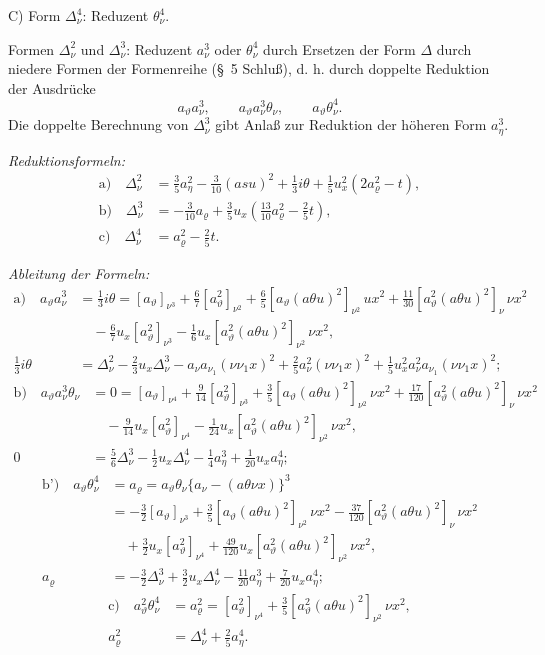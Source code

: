 \documentclass[11pt]{article}
\newcommand{\A}{\Delta}
\newcommand{\R}{\varrho}
\begin{document}
\noindent C) Form $\A_\nu^4$: Reduzent $\theta_\nu^4$.

Formen $\A_\nu^2$ und $\A_\nu^3$: Reduzent $a_\nu^3$ oder $\theta_\nu^4$ durch Ersetzen der Form $\A$ durch niedere Formen der Formenreihe (\S\ 5 Schluß), d. h. durch doppelte Reduktion der Ausdrücke
\[
a_\vartheta a_\nu^3,
\qquad a_\vartheta a_\nu^3\theta_\nu,
\qquad a_\vartheta\theta_\nu^4.
\]
Die doppelte Berechnung von $\A_\nu^3$ gibt Anlaß zur Reduktion der höheren Form $a_\eta^3$.

\noindent\emph{Reduktionsformeln:}
\[
\tag{10}
\begin{aligned}
\text{a)}\quad \A_\nu^2
&=\frac35a_\eta^2-\frac3{10}(asu)^2+\frac13 i\theta
+\frac15u_x^2(2a_\R^2-t),\\
\text{b)}\quad \A_\nu^3
&=-\frac3{10}a_\R+\frac35u_x\left(\frac{13}{10}a_\R^2-\frac25t\right),\\
\text{c)}\quad \A_\nu^4&=a_\R^2-\frac25t.
\end{aligned}
\]

\noindent\emph{Ableitung der Formeln:}
\[
\begin{aligned}
\text{a)}\quad
 a_\vartheta a_\nu^3
&=\frac13 i\theta
=[a_\vartheta]_{\nu^3}+\frac67[a_\vartheta^2]_{\nu^2}
+\frac65[a_\vartheta(a\theta u)^2]_{\nu^2}\,
u x^2
+\frac{11}{30}[a_\vartheta^2(a\theta u)^2]_\nu\,\nu x^2\\
&\quad-\frac67u_x[a_\vartheta^2]_{\nu^3}
-\frac16u_x[a_\vartheta^2(a\theta u)^2]_{\nu^2}\,\nu x^2,\\
\frac13 i\theta
&=\A_\nu^2-\frac23u_x\A_\nu^3-a_\nu a_{\nu_1}(\nu\nu_1x)^2
+\frac25a_\nu^2(\nu\nu_1x)^2
+\frac15u_x^2a_\nu^2a_{\nu_1}(\nu\nu_1x)^2;
\end{aligned}
\]
\[
\begin{aligned}
\text{b)}\quad
 a_\vartheta a_\nu^3\theta_\nu
&=0=[a_\vartheta]_{\nu^4}+\frac9{14}[a_\vartheta^2]_{\nu^3}
+\frac35[a_\vartheta(a\theta u)^2]_{\nu^2}\,\nu x^2
+\frac{17}{120}[a_\vartheta^2(a\theta u)^2]_{\nu}\,\nu x^2\\
&\quad-\frac9{14}u_x[a_\vartheta^2]_{\nu^4}
-\frac1{24}u_x[a_\vartheta^2(a\theta u)^2]_{\nu^2}\,\nu x^2,\\
0&=\frac56\A_\nu^3-\frac12u_x\A_\nu^4-\frac14a_\eta^3+\frac1{20}u_xa_\eta^4;
\end{aligned}
\]
\[
\begin{aligned}
\text{b')}\quad
 a_\vartheta\theta_\nu^4
&=a_\R=a_\vartheta\theta_\nu\{a_\nu-(a\theta\nu x)\}^3\\
&=-\frac32[a_\vartheta]_{\nu^3}+\frac35[a_\vartheta(a\theta u)^2]_{\nu^2}\,\nu x^2
-\frac{37}{120}[a_\vartheta^2(a\theta u)^2]_{\nu}\,\nu x^2\\
&\quad+\frac32u_x[a_\vartheta^2]_{\nu^4}
+\frac{49}{120}u_x[a_\vartheta^2(a\theta u)^2]_{\nu^2}\,\nu x^2,\\
a_\R&=-\frac32\A_\nu^3+\frac32u_x\A_\nu^4-\frac{11}{20}a_\eta^3+\frac7{20}u_xa_\eta^4;
\end{aligned}
\]
\[
\begin{aligned}
\text{c)}\quad
 a_\vartheta^2\theta_\nu^4
&=a_\R^2=[a_\vartheta^2]_{\nu^4}+\frac35[a_\vartheta^2(a\theta u)^2]_{\nu^2}\,\nu x^2,\\
a_\R^2&=\A_\nu^4+\frac25a_\eta^4.
\end{aligned}
\]
\end{document}

